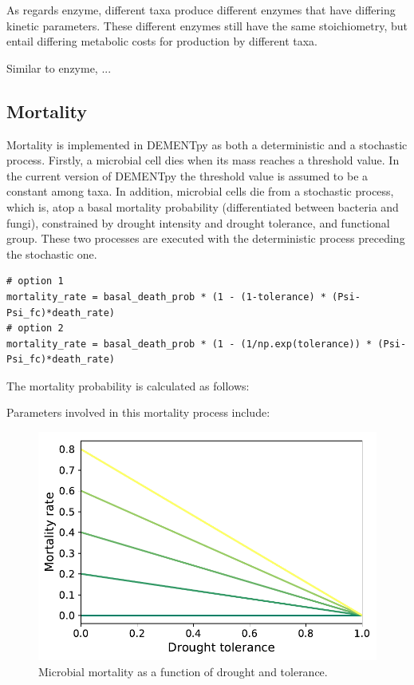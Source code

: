 \documentclass[12pt, oneside, titlepage]{article}      %
\begin{document}
As regards enzyme, different taxa produce different enzymes that have differing kinetic parameters. These different enzymes still have the same stoichiometry, but entail differing metabolic costs for production by different taxa. 

Similar to enzyme, ...

\subsection{Mortality}
Mortality is implemented in DEMENTpy as both a deterministic and a stochastic process. Firstly, a microbial cell dies when its mass reaches a threshold value. In the current version of DEMENTpy the threshold value is assumed to be a constant among taxa. In addition, microbial cells die from a stochastic process, which is, atop a basal mortality probability (differentiated between bacteria and fungi), constrained by drought intensity and drought tolerance, and functional group. These two processes are executed with the deterministic process preceding the stochastic one. 

\begin{lstlisting}[frame=single]
# option 1
mortality_rate = basal_death_prob * (1 - (1-tolerance) * (Psi-Psi_fc)*death_rate)
# option 2
mortality_rate = basal_death_prob * (1 - (1/np.exp(tolerance)) * (Psi-Psi_fc)*death_rate)
\end{lstlisting}

The mortality probability is calculated as follows:

Parameters involved in this mortality process include:

\begin{figure}[H]
  \centering
  \includegraphics[width=\linewidth]{figures/Fig2_Microbial_mortality_prob.pdf}
  \caption{Microbial mortality as a function of drought and tolerance.}
  \label{fig:mortality}
\end{figure}
\end{document}

